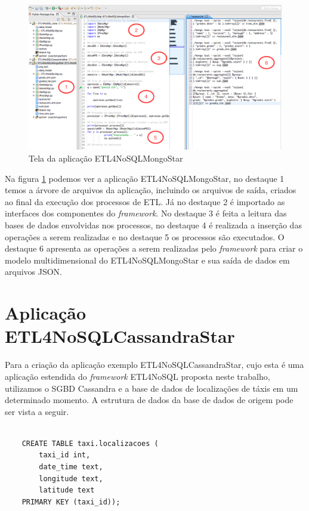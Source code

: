 \begin{figure}[h!]
	\centering
	\includegraphics[scale=0.4]{fig/ETL4NoSQLMongoStar.png}
	\caption{Tela da aplicação ETL4NoSQLMongoStar}
	\label{etl4nosqlmongostar}
\end{figure}

Na figura \ref{etl4nosqlmongostar} podemos ver a aplicação ETL4NoSQLMongoStar, no destaque 1 temos a árvore de arquivos da aplicação, incluindo os arquivos de saída, criados ao final da execução dos processos de ETL. Já no destaque 2 é importado as interfaces dos componentes do \textit{framework}. No destaque 3 é feita a leitura das bases de dados envolvidas nos processos, no destaque 4 é realizada a inserção das operações a serem realizadas e no destaque 5 os processos são executados. O destaque 6 apresenta as operações a serem realizadas pelo \textit{framework} para criar o modelo multidimensional do ETL4NoSQLMongoStar e sua saída de dados em arquivos JSON.

\section{Aplicação ETL4NoSQLCassandraStar}

Para a criação da aplicação exemplo ETL4NoSQLCassandraStar, cujo esta é uma aplicação estendida do \textit{framework} ETL4NoSQL proposta neste trabalho, utilizamos o SGBD Cassandra e a base de dados de localizações de táxis em um determinado momento. A estrutura de dados da base de dados de origem pode ser vista a seguir.

\begin{lstlisting}[frame=single, language=Oberon-2, basicstyle=\tiny]

	CREATE TABLE taxi.localizacoes (  
		taxi_id int, 
		date_time text,
		longitude text,
		latitude text 
	PRIMARY KEY (taxi_id));

\end{lstlisting}

